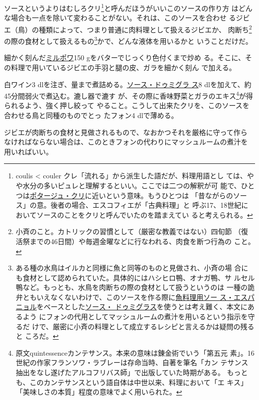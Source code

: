 \begin{recette}
  

ソースというよりはむしろクリ\footnote{coulis \textless{} couler
  クレ「流れる」から派生した語だが、料理用語とし
  ては、やや水分の多いピュレと理解するといい。ここでは二つの解釈が可
  能で、ひとつは\href{}{ポタージュ・クリ}に近いという意味。もうひとつは
  「昔ながらのソース」の意。後者の場合、エスコフィエが「古典料理」と
  呼ぶ17、18世紀においてソースのことをクリと呼んでいたのを踏まえてい
  ると考えられる。}と呼んだほうがいいこのソースの作り方
はどんな場合も一点を除いて変わることがない。それは、このソースを合わせ
るジビエ（鳥）の種類によって、つまり普通に肉料理として扱えるジビエか、
肉断ち\footnote{小斉のこと。カトリックの習慣として（厳密な教義ではない）四旬節
  （復活祭までの46日間）や毎週金曜などに行なわれる、肉食を断つ行為の
  こと。}の際の食材として扱えるもの\footnote{ある種の水鳥はイルカと同様に魚と同等のものと見做され、小斉の場
  合にも食材として認められていた。具体的にはハシヒロ鴨、オナガ鴨、サ
  ルセル鴨など。もっとも、水鳥を肉断ちの際の食材として扱うというのは
  一種の詭弁ともいえなくないわけで、このソースを作る際に\protect\hyperlink{sauce-espagnole-maigre}{魚料理用ソー
  ス・エスパニョル}をベースとした\protect\hyperlink{sauce-demi-glace}{ソース・
  ドゥミグラス}を使うとは考え難く、本文にあるよう
  にフォンの代用としてマッシュルームの煮汁を用いるという指示を守るだ
  けで、厳密に小斉の料理として成立するレシピと言えるかは疑問の残ると
  ころだ。}かで、どんな液体を用いるかと いうことだけだ。

細かく刻んだ\protect\hyperlink{mirepoix}{ミルポワ}150
gをバターでじっくり色付くまで炒め
る。そこに、その料理で用いているジビエの手羽と腿の皮、ガラを細かく刻ん
で加える。

白ワイン3
dlを注ぎ、\untiers{}量まで煮詰める。\protect\hyperlink{sauce-demi-glace}{ソース・ドゥミグラ
ス}8 dlを加えて、約45分間弱火で煮込む。漉し器で漉す
が、その際に香味野菜とガラのエキス\footnote{原文quintessenceカンテサンス。本来の意味は錬金術でいう「第五元
  素」。16世紀の作家フランソワ・ラブレーは存命当時、自著を筆名「カン
  テサンス抽出をなし遂げたアルコフリバス師」で出版していた時期がある。
  もっとも、このカンテサンスという語自体は中世以来、料理において「エ
  キス」「美味しさの本質」程度の意味でよく用いられた。}が得られるよう、強く押し絞って
やること。こうして出来たクリを、このソースを合わせる鳥と同種のものでとっ
たフォン4 dlで薄める。

ジビエが肉断ちの食材と見做されるもので、なおかつそれを厳格に守って作ら
なければならない場合は、このときフォンの代わりにマッシュルームの煮汁を
用いればいい。


\end{recette}

